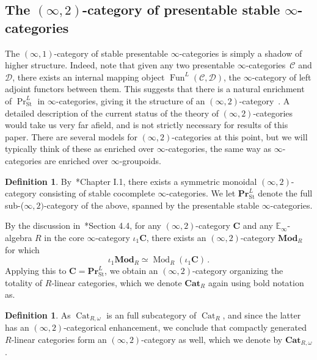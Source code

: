 \documentclass[10pt]{amsart}
\theoremstyle{plain}
\theoremstyle{definition}
\newtheorem{definition}[theorem]{Definition}
\DeclareMathOperator{\Mod}{Mod}
\DeclareMathOperator{\Fun}{Fun}
\DeclareMathOperator{\Cat}{Cat}
\newcommand{\St}{\mathrm{St}}
\newcommand{\bE}{\mathbb{E}}
\newcommand{\cC}{\mathcal{C}}
\newcommand{\calD}{\mathcal{D}}
\begin{document}
\subsection{The $(\infty, 2)$-category of presentable stable $\infty$-categories}

The $(\infty,1)$-category of stable presentable $\infty$-categories is simply a shadow of higher structure.
Indeed, note that given any two presentable $\infty$-categories~$\cC$ and $\calD$, there exists an internal mapping object $\Fun^{L}(\cC, \calD)$, the $\infty$-category of left adjoint functors between them.
This suggests that there is a natural enrichment of $\Pr^{L}_{\St}$ in $\infty$-categories, giving it the structure of an $(\infty, 2)$-category~\cite{GH15}.
A detailed description of the current status of the theory of $(\infty,2)$-categories would take us very far afield, and is not strictly necessary for results of this paper.
There are several models for $(\infty,2)$-categories at this point, but we will typically think of these as enriched over $\infty$-categories, the same way as $\infty$-categories are enriched over $\infty$-groupoids.

\begin{definition}
By~\cite{GR17}*{Chapter I.1}, there exists a symmetric monoidal $(\infty,2)$-category consisting of stable cocomplete $\infty$-categories. We let $\mathbf{Pr}^{L}_{\St}$ denote the full sub-($\infty,2)$-category of the above, spanned by  the presentable stable $\infty$-categories.
\end{definition}

By the discussion in~\cite{HSS17}*{Section 4.4}, for any $(\infty,2)$-category $\mathbf{C}$ and any $\bE_{\infty}$-algebra $R$ in the core $\infty$-category $\iota_1 \mathbf{C}$, there exists an $(\infty,2)$-category $\mathbf{Mod}_{R}$ for which
\[
\iota_1 \mathbf{Mod}_{R} \simeq \Mod_R(\iota_1 \mathbf{C}) \,.
\]
Applying this  to  $\mathbf{C} = \mathbf{Pr}^{L}_{\St}$, we obtain an $(\infty,2)$-category organizing the totality of $R$-linear categories, which we denote $\mathbf{Cat}_{R}$ again using bold notation as.

\begin{definition}
As $\Cat_{R, \omega}$ is an full subcategory of $\Cat_{R}$, and since the latter has an $(\infty,2)$-categorical enhancement, we conclude that compactly generated $R$-linear categories form an $(\infty,2)$-category as well, which we denote by $\mathbf{Cat}_{R, \omega}$.
\end{definition}
\end{document}
